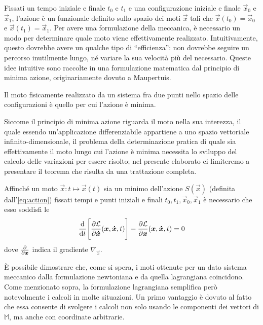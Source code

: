 Fissati un tempo iniziale e finale $t_0$ e $t_1$ e una configurazione iniziale e finale $\vec{x}_0$ e $\vec{x}_1$, l'azione è un funzionale definito sullo spazio dei moti $\vec{x}$ tali che $\vec{x}(t_0) = \vec{x}_0$ e $\vec{x}(t_1)=\vec{x}_1$. Per avere una formulazione della meccanica, è necessario un modo per determinare quale moto viene effettivamente realizzato. Intuitivamente, questo dovrebbe avere un qualche tipo di \textquotedblleft efficienza\textquotedblright: non dovrebbe seguire un percorso inutilmente lungo, né variare la sua velocità più del necessario. Queste idee intuitive sono raccolte in una formulazione matematica dal principio di minima azione, originariamente dovuto a Maupertuis.
\begin{minaction}
Il moto fisicamente realizzato da un sistema fra due punti nello spazio delle configurazioni è quello per cui l'azione è minima.
\end{minaction}
Siccome il principio di minima azione riguarda il moto nella sua interezza, il quale essendo un'applicazione differenziabile appartiene a uno spazio vettoriale infinito-dimensionale, il problema della determinazione pratica di quale sia effettivamente il moto lungo cui l'azione è minima necessita lo sviluppo del calcolo delle variazioni per essere risolto; nel presente elaborato ci limiteremo a presentare il teorema che risulta da una trattazione completa.
\begin{theorem}
  Affinché un moto $\vec{x}: t\mapsto \vec{x}(t)$ sia un minimo dell'azione $S(\vec{x})$ (definita dall'\autoref{eq:action}) fissati tempi e punti iniziali e finali $t_0, t_1, \vec{x}_0, \vec{x}_1$ è necessario che esso soddisfi le  \begin{equation}
    \dv{t}\Bigg[\pdv{\mathcal{L}}{\boldsymbol{\dot{x}}}()(\boldsymbol{x}, \boldsymbol{\dot{x}}, t)\Bigg] - \pdv{\mathcal{L}}{\boldsymbol{x}}()(\boldsymbol{x}, \boldsymbol{\dot{x}}, t) = 0
  \end{equation} 
  dove $\pdv{\boldsymbol{x}}$ indica il gradiente $\nabla_{\vec{x}}$.
\end{theorem}

È possibile dimostrare che, come si spera, i moti ottenute per un dato sistema meccanico dalla formulazione newtoniana e da quella lagrangiana coincidono. Come menzionato sopra, la formulazione lagrangiana semplifica però notevolmente i calcoli in molte situazioni. Un primo vantaggio è dovuto al fatto che essa consente di svolgere i calcoli non solo usando le componenti dei vettori di $\mathbb{M}$, ma anche con coordinate arbitrarie.

